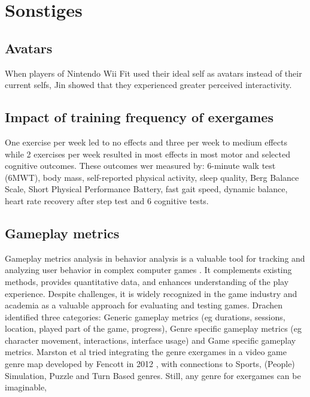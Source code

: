 \chapter{Sonstiges}

\section{Avatars}
When players of Nintendo Wii Fit used their ideal self as avatars instead of their current selfs, Jin \cite{jin2009avatars} showed that they experienced greater perceived interactivity.

\section{Impact of training frequency of exergames}
One exercise per week led to no effects and three per week to medium effects while 2 exercises per week resulted in most effects  in most motor and selected cognitive outcomes. These outcomes wer measured by: 6-minute walk test (6MWT), body mass, self-reported physical activity, sleep quality, Berg Balance Scale, Short Physical Performance Battery, fast gait speed, dynamic balance, heart rate recovery after step test and 6 cognitive tests. \cite{hortobagyi2012effects}

\section{Gameplay metrics}
Gameplay metrics analysis in behavior analysis is a valuable tool for tracking and analyzing user behavior in complex computer games \cite{drachen2015behavioral}. It complements existing methods, provides quantitative data, and enhances understanding of the play experience. Despite challenges, it is widely recognized in the game industry and academia as a valuable approach for evaluating and testing games. Drachen identified three categories: Generic gameplay metrics (eg durations, sessions, location, played part of the game, progress), Genre specific gameplay metrics (eg character movement, interactions, interface usage) and Game specific gameplay metrics.
Marston et al \cite{marston2013play} tried integrating the genre exergames in a video game genre map developed by Fencott in 2012 \cite{clay2012game}, with connections to Sports, (People) Simulation, Puzzle and Turn Based genres. Still, any genre for exergames can be imaginable, 

